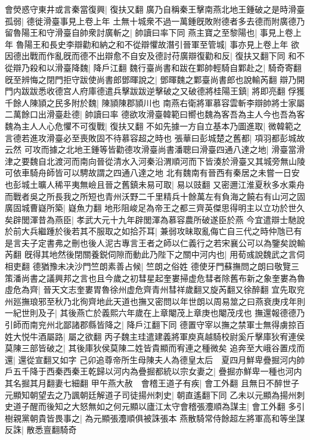會熒惑守東井或言秦當復興|{
	復扶又翻}
廣乃自稱秦王擊南燕北地王鍾破之是時滑臺孤弱|{
	德徙滑臺事見上卷上年}
土無十城衆不過一萬鍾旣敗附德者多去德而附廣德乃留魯陽王和守滑臺自帥衆討廣斬之|{
	帥讀曰率下同}
燕主寶之至黎陽也|{
	事見上卷上年}
魯陽王和長史李辯勸和納之和不從辯懼故潛引晉軍至管城|{
	事亦見上卷上年}
欲因德出戰而作亂旣而德不出辯愈不自安及德討苻廣辯復勸和反|{
	復扶又翻下同}
和不從辯乃殺和以滑臺降魏|{
	降戶江翻}
魏行臺尚書和跋在鄴帥輕騎自鄴赴之|{
	騎奇寄翻}
旣至辨悔之閉門拒守跋使尚書郎鄧暉說之|{
	鄧暉魏之鄴臺尚書郎也說輸芮翻}
辯乃開門内跋跋悉收德宫人府庫德遣兵擊跋跋逆擊破之又破德將桂陽王鎮|{
	將即亮翻}
俘獲千餘人陳頴之民多附於魏|{
	陳頴陳郡頴川也}
南燕右衛將軍慕容雲斬李辯帥將士家屬二萬餘口出滑臺赴德|{
	帥讀曰率}
德欲攻滑臺韓範曰嚮也魏為客吾為主人今也吾為客魏為主人人心危懼不可復戰|{
	復扶又翻}
不如先據一方自立基本乃圖進取|{
	微韓範之言德若進攻滑臺必至喪敗固不待慕容超之時也}
張華曰彭城楚之舊都|{
	項羽都彭城故云然}
可攻而據之北地王鍾等皆勸德攻滑臺尚書潘聰曰滑臺四通八達之地|{
	滑臺當滑津之要魏自北渡河而南向晉從清水入河秦沿渭順河而下皆湊於滑臺又其城旁無山陵可依車騎舟師皆可以騁故謂之四通八達之地}
北有魏南有晉西有秦居之未嘗一日安也彭城土曠人稀平夷無嶮且晉之舊鎮未易可取|{
	易以豉翻}
又密邇江淮夏秋多水乘舟而戰者吳之所長我之所短也青州沃野二千里精兵十餘萬左有負海之饒右有山河之固廣固城曹嶷所築|{
	嶷魚力翻}
地形阻峻足為帝王之都三齊英傑思得明主以立功於世久矣辟閭渾昔為燕臣|{
	孝武大元十九年辟閭渾為慕容農所破遂臣於燕}
今宜遣辯士馳說於前大兵繼踵於後若其不服取之如拾芥耳|{
	兼弱攻昧取亂侮亡自三代之時仲虺已有是言夫子定書弗之刪也後人泥古專言王者之師以仁義行之若宋襄公可以為鑒矣說輸芮翻}
旣得其地然後閉關養鋭伺隙而動此乃陛下之關中河内也|{
	用荀彧說魏武之言伺相吏翻}
德猶豫未决沙門竺朗素善占候|{
	竺朗之俗姓}
德使牙門蘇撫問之朗曰敬覽三策潘尚書之議興邦之言也且今歲之初彗星起奎婁掃虚危彗者除舊布新之象奎婁為魯虛危為齊|{
	晉天文志奎婁胃魯徐州虚危齊青州彗祥歲翻又旋芮翻又徐醉翻}
宜先取兖州廵撫琅邪至秋乃北徇齊地此天道也撫又密問以年世朗以周易筮之曰燕衰庚戌年則一紀世則及子|{
	其後燕亡於義熙六年歲在上章閹茂上章庚也閹茂戌也}
撫還報德德乃引師而南兖州北鄙諸郡縣皆降之|{
	降戶江翻下同}
德置守宰以撫之禁軍士無得虜掠百姓大悦牛酒屬路|{
	屬之欲翻}
丙子魏主珪遣建義將軍庾真越騎校尉奚斤擊庫狄宥連侯莫陳三部皆破之|{
	其後庫狄侯莫陳二姓皆貴顯而宥連之種微矣}
追奔至大峨谷置戍而還|{
	還從宣翻又如字}
己卯追尊帝所生母陳夫人為德皇太后　夏四月鮮卑疊掘河内帥戶五千降于西秦西秦王乾歸以河内為疊掘都統以宗女妻之|{
	疊掘亦鮮卑一種也河内其名掘其月翻妻七細翻}
甲午燕大赦　會稽王道子有疾|{
	會工外翻}
且無日不醉世子元顯知朝望去之乃諷朝廷解道子司徒揚州刺史|{
	朝直遙翻下同}
乙未以元顯為揚州刺史道子醒而後知之大怒無如之何元顯以廬江太守會稽張灋順為謀主|{
	會工外翻}
多引樹親黨朝貴皆畏事之|{
	為元顯張灋順俱被誅張本}
燕散騎常侍餘超左將軍高和等坐謀反誅|{
	散悉亶翻騎奇}


